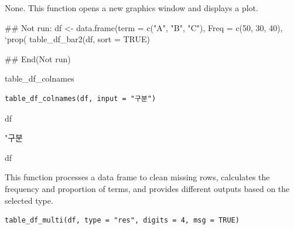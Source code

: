 \documentclass[a4paper]{book}
\begin{document}
%
\begin{Value}
None. This function opens a new graphics window and displays a plot.
\end{Value}
%
\begin{Examples}
\begin{ExampleCode}
\#\# Not run: 
df <- data.frame(term = c("A", "B", "C"),
                 Freq = c(50, 30, 40),
                 `prop(%
table_df_bar2(df, sort = TRUE)

## End(Not run)

\end{ExampleCode}
\end{Examples}
%
\begin{Description}
table\_df\_colnames
\end{Description}
%
\begin{Usage}
\begin{verbatim}
table_df_colnames(df, input = "구분")
\end{verbatim}
\end{Usage}
%
\begin{Arguments}
\begin{ldescription}
\item[\code{df}] df

\item[\code{input}] "구분
\end{ldescription}
\end{Arguments}
%
\begin{Value}
df
\end{Value}
%
\begin{Description}
This function processes a data frame to clean missing rows, calculates the frequency
and proportion of terms, and provides different outputs based on the selected type.
\end{Description}
%
\begin{Usage}
\begin{verbatim}
table_df_multi(df, type = "res", digits = 4, msg = TRUE)
\end{verbatim}
\end{Usage}
%
\end{document}
